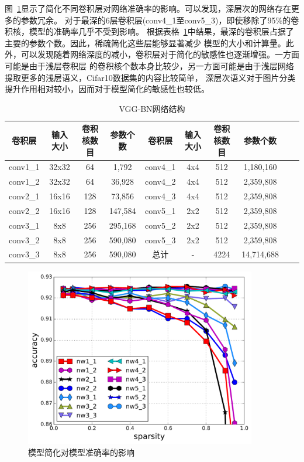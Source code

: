 \documentclass[doctor]{ustcthesis}
\begin{document}
图~\ref{fig:sofs-cnn-simplify}显示了简化不同卷积层对网络准确率的影响。可以发现，深层次的网络存在更多的参数冗余。
对于最深的6层卷积层(conv4\_1至conv5\_3)，即使移除了95\%的卷积核，模型的准确率几乎不受到影响。
根据表格~\ref{tab:vgg-bn-network}中结果，最深的卷积层占据了主要的参数个数。因此，稀疏简化这些层能够显著减少
模型的大小和计算量。此外，可以发现随着网络深度的减小，卷积层对于简化的敏感性也逐渐增强。一方面可能是由于浅层卷积层
的卷积核个数本身比较少，另一方面可能是由于浅层网络提取更多的浅层语义，Cifar10数据集的内容比较简单，
深层次语义对于图片分类提升作用相对较小，因而对于模型简化的敏感性也较低。

\begin{table}[t]
    \centering
    \caption{VGG-BN网络结构}
    \label{tab:vgg-bn-network}
    \footnotesize
    \begin{tabular}{|c|c|c|c|c|c|c|c|c|c|}
        \hline
        卷积层 & 输入大小 & 卷积核数目 & 参数个数 & 卷积层 & 输入大小 & 卷积核数目 & 参数个数 \\ \hline
        conv1\_1 & 32x32 & 64 & 1,792 & conv4\_1 & 4x4 & 512 & 1,180,160 \\ \hline
        conv1\_2 & 32x32 & 64 & 36,928 & conv4\_2 & 4x4 & 512 & 2,359,808 \\ \hline
        conv2\_1 & 16x16 & 128 & 73,856 & conv4\_3 & 4x4 & 512 & 2,359,808 \\ \hline
        conv2\_2 & 16x16 & 128 & 147,584 & conv5\_1 & 2x2 & 512 & 2,359,808 \\ \hline
        conv3\_1 & 8x8 & 256 & 295,168 & conv5\_2 & 2x2 & 512 & 2,359,808 \\ \hline
        conv3\_2 & 8x8 & 256 & 590,080 & conv5\_3 & 2x2 & 512 & 2,359,808 \\ \hline
        conv3\_3 & 8x8 & 256 & 590,080 & 总计 & - & 4224 & 14,714,688 \\ \hline
    \end{tabular}
\end{table}
\begin{figure}[t]
    \center
    \includegraphics[clip=true, width=0.9\textwidth]{sofs-cnn-simplify.pdf}
    \caption{模型简化对模型准确率的影响}
    \label{fig:sofs-cnn-simplify}
    \vspace{-2em}
\end{figure}
\end{document}
